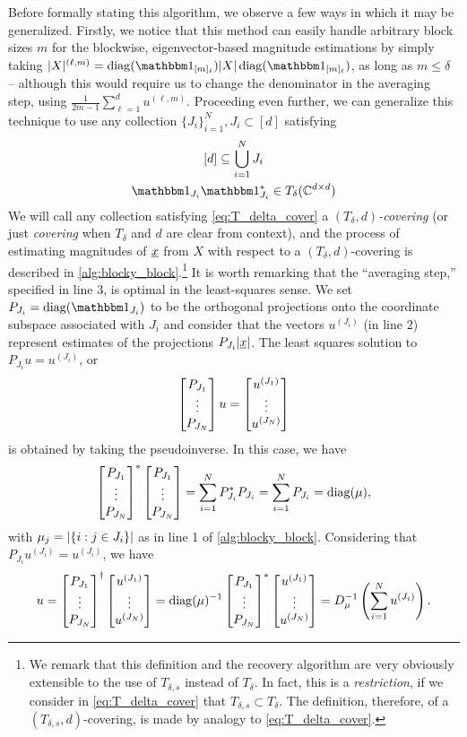 Before formally stating this algorithm, we observe a few ways in which it may be generalized.  Firstly, we notice that this method can easily handle arbitrary block sizes $m$ for the blockwise, eigenvector-based magnitude estimations by simply taking $\abs{X}^{(\ell, m)} = \diag(\one_{[m]_\ell}) \abs{X} \diag(\one_{[m]_\ell})$, as long as $m \le \delta$ -- although this would require us to change the denominator in the averaging step, using $\frac{1}{2 m - 1} \sum_{\ell = 1}^d u^{(\ell, m)}$.  Proceeding even further, we can generalize this technique to use any collection $\{J_i\}_{i = 1}^N, J_i \subset [d]$ satisfying \begin{equation} \begin{gathered} [d] \subset \bigcup_{i = 1}^N J_i \\ \one_{J_i} \one_{J_i}^* \in T_{\delta}(\Cdxd) \end{gathered} \label{eq:T_delta_cover}\end{equation}  We will call any collection satisfying \eqref{eq:T_delta_cover} a \emph{$(T_\delta, d)$-covering} (or just \emph{covering} when $T_\delta$ and $d$ are clear from context), and the process of estimating magnitudes of $\underline{x}$ from $X$ with respect to a $(T_\delta, d)$-covering is described in \cref{alg:blocky_block}.\footnote{We remark that this definition and the recovery algorithm are very obviously extensible to the use of $T_{\delta, s}$ instead of $T_\delta$.  In fact, this is a \emph{restriction}, if we consider in \eqref{eq:T_delta_cover} that $T_{\delta, s} \subset T_\delta$.  The definition, therefore, of a $(T_{\delta, s}, d)$-covering, is made by analogy to \eqref{eq:T_delta_cover}.}  It is worth remarking that the ``averaging step,'' specified in line 3, is optimal in the least-squares sense.  We set $P_{J_i} = \diag(\one_{J_i})$ to be the orthogonal projections onto the coordinate subspace associated with $J_i$ and consider that the vectors $u^{(J_i)}$ (in line 2) represent estimates of the projections $P_{J_i} \lvert\underline{x}\rvert$.  The least squares solution to $P_{J_i} u = u^{(J_i)}$, or \[\begin{bmatrix} P_{J_1} \\ \vdots \\ P_{J_N} \end{bmatrix} u = \begin{bmatrix} u^{(J_1)} \\ \vdots \\ u^{(J_N)} \end{bmatrix}\] is obtained by taking the pseudoinverse.  In this case, we have \[\begin{bmatrix} P_{J_1} \\ \vdots \\ P_{J_N} \end{bmatrix}^* \begin{bmatrix} P_{J_1} \\ \vdots \\ P_{J_N} \end{bmatrix} = \sum_{i = 1}^N P_{J_i}^* P_{J_i} = \sum_{i = 1}^N P_{J_i} = \operatorname{diag}(\mu),\] with $\mu_j = \lvert\{i : j \in J_i\}\rvert$ as in line 1 of \cref{alg:blocky_block}.  Considering that $P_{J_i} u^{(J_i)} = u^{(J_i)}$, we have \[u = \begin{bmatrix} P_{J_1} \\ \vdots \\ P_{J_N} \end{bmatrix}^{\dag} \begin{bmatrix} u^{(J_1)} \\ \vdots \\ u^{(J_N)} \end{bmatrix} =  \operatorname{diag}(\mu)^{-1} \begin{bmatrix} P_{J_1} \\ \vdots \\ P_{J_N} \end{bmatrix}^* \begin{bmatrix} u^{(J_1)} \\ \vdots \\ u^{(J_N)} \end{bmatrix} = D_\mu^{-1}\left(\sum_{i = 1}^N u^{(J_i)}\right).\]

